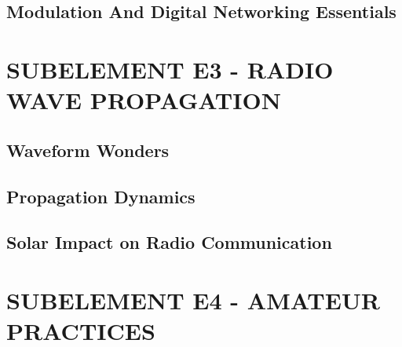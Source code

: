 \documentclass[12pt]{book}
\begin{document}
\section{Modulation And Digital Networking Essentials}













\chapter{SUBELEMENT E3 - RADIO WAVE PROPAGATION}
\section{Waveform Wonders}














\section{Propagation Dynamics}













\section{Solar Impact on Radio Communication}












\chapter{SUBELEMENT E4 - AMATEUR PRACTICES}
\end{document}
